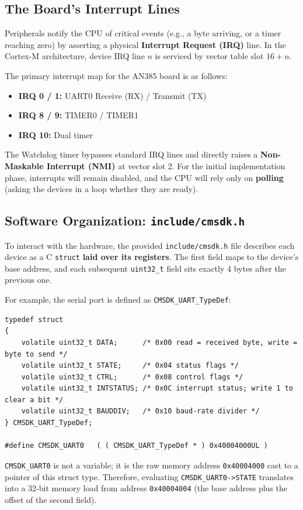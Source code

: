 \subsection{The Board's Interrupt Lines}
Peripherals notify the CPU of critical events (e.g., a byte arriving, or a timer reaching zero) by asserting a physical \textbf{Interrupt Request (IRQ)} line. In the Cortex-M architecture, device IRQ line $n$ is serviced by vector table slot $16 + n$.

The primary interrupt map for the AN385 board is as follows:
\begin{itemize}
    \item \textbf{IRQ 0 / 1:} UART0 Receive (RX) / Transmit (TX)
    \item \textbf{IRQ 8 / 9:} TIMER0 / TIMER1
    \item \textbf{IRQ 10:} Dual timer
\end{itemize}
The Watchdog timer bypasses standard IRQ lines and directly raises a \textbf{Non-Maskable Interrupt (NMI)} at vector slot 2. For the initial implementation phase, interrupts will remain disabled, and the CPU will rely only on \textbf{polling} (asking the devices in a loop whether they are ready).

\subsection{Software Organization: \texttt{include/cmsdk.h}}
To interact with the hardware, the provided \texttt{include/cmsdk.h} file describes each device as a C \texttt{struct} \textbf{laid over its registers}. The first field maps to the device's base address, and each subsequent \texttt{uint32\_t} field sits exactly 4 bytes after the previous one. 

For example, the serial port is defined as \texttt{CMSDK\_UART\_TypeDef}:
\begin{lstlisting}
typedef struct
{
    volatile uint32_t DATA;      /* 0x00 read = received byte, write = byte to send */
    volatile uint32_t STATE;     /* 0x04 status flags */
    volatile uint32_t CTRL;      /* 0x08 control flags */
    volatile uint32_t INTSTATUS; /* 0x0C interrupt status; write 1 to clear a bit */
    volatile uint32_t BAUDDIV;   /* 0x10 baud-rate divider */
} CMSDK_UART_TypeDef;

#define CMSDK_UART0   ( ( CMSDK_UART_TypeDef * ) 0x40004000UL )
\end{lstlisting}

\texttt{CMSDK\_UART0} is not a variable; it is the raw memory address \texttt{0x40004000} cast to a pointer of this struct type. Therefore, evaluating \texttt{CMSDK\_UART0->STATE} translates into a 32-bit memory load from address \texttt{0x40004004} (the base address plus the offset of the second field). 

